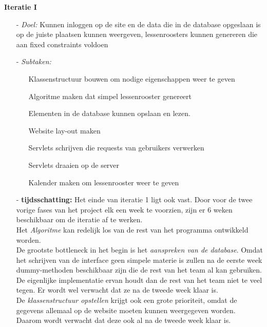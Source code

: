 \documentclass{article}
\begin{document}
\textbf{Iteratie I}
\begin{itemize}
\item[-] \textit{Doel:} Kunnen inloggen op de site en de data die in de database opgeslaan is op de juiste plaatsen kunnen weergeven, lessenroosters kunnen genereren die aan fixed constraints voldoen\\[-5mm]
\item[-] \textit{Subtaken:} \\[-5mm]
\begin{itemize}
	\item[] Klassenstructuur bouwen om nodige eigenschappen weer te geven \\[-5mm]
	\item[] Algoritme maken dat simpel lessenrooster genereert \\[-5mm]
	\item[] Elementen in de database kunnen opslaan en lezen. \\[-5mm]
	\item[] Website lay-out maken \\[-5mm]
	\item[] Servlets schrijven die requests van gebruikers verwerken \\[-5mm]
	\item[] Servlets draaien op de server \\[-5mm]
	\item[] Kalender maken om lessenrooster weer te geven \\[-5mm]
\end{itemize}
\item[-] \textbf{tijdsschatting:} Het einde van iteratie 1 ligt ook vast. Door voor de twee vorige fases van het project elk een week te voorzien, zijn er 6 weken beschikbaar om de iteratie af te werken.\\
Het \textit{Algoritme} kan redelijk los van de rest van het programma ontwikkeld worden. \\
De grootste bottleneck in het begin is het \textit{aanspreken van de database}. Omdat het schrijven van de interface geen simpele materie is zullen na de eerste week dummy-methoden beschikbaar zijn die de rest van het team al kan gebruiken. De eigenlijke implementatie ervan houdt dan de rest van het team niet te veel tegen. Er wordt wel verwacht dat ze na de tweede week klaar is. \\
De \textit{klassenstructuur opstellen} krijgt ook een grote prioriteit, omdat de gegevens allemaal op de website moeten kunnen weergegeven worden. Daarom wordt verwacht dat deze ook al na de tweede week klaar is. \\

\end{itemize}
\end{document}
